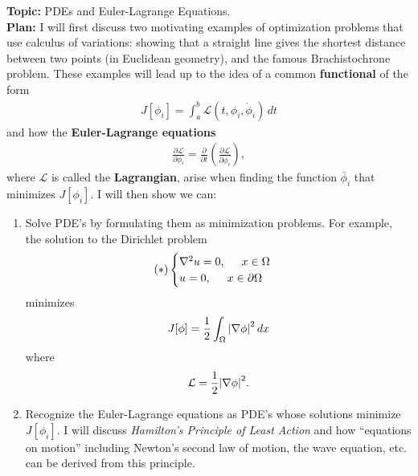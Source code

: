 \documentclass{article}
\theoremstyle{definition}
\newcommand{\p}{\partial}
\newcommand{\f}[2]{\frac{#1}{#2}}
\newcommand{\lp}{\left(}
\newcommand{\rp}{\right)}
\newcommand{\lag}{\mathcal{L}}
\begin{document}
\noindent \textbf{Topic:} PDEs and Euler-Lagrange Equations.\\

\noindent \textbf{Plan:} I will first discuss two motivating examples of optimization problems that use calculus of variations: showing that a straight line gives the shortest distance between two points (in Euclidean geometry), and the famous Brachistochrone problem. These examples will lead up to the idea of a common \textbf{functional} of the form
\begin{align*}
J[\phi_i] = \int^b_a \lag(t,\phi_i,\dot{\phi}_i)\,dt
\end{align*}
and how the \textbf{Euler-Lagrange equations}
\begin{align*}
\f{\p \lag }{\p \phi_i} = \f{\p}{\p t} \lp\f{\p \lag}{\p \dot{\phi}_i}\rp,
\end{align*}
where $\lag$ is called the \textbf{Lagrangian}, arise when finding the function $\bar{\phi}_i$ that minimizes $J[\phi_i]$. I will then show we can:
\begin{enumerate}
	\item Solve PDE's by formulating them as minimization problems. For example, the solution to the Dirichlet problem 
	\begin{align*}
	(\ast) \begin{cases}
	\nabla^2u = 0, \hspace{0.5cm}  \text{$x\in \Omega$}\\
	u = 0, \hspace{0.5cm} \text{$x \in \p \Omega$}
	\end{cases}
	\end{align*}
	minimizes 
	\begin{align*}
	J[\phi] = \f{1}{2}\int_\Omega \abs{\nabla \phi}^2\,dx
	\end{align*}
	where
	\begin{align*}
	\lag = \f{1}{2}\abs{\nabla \phi}^2.
	\end{align*}
	\item Recognize the Euler-Lagrange equations as PDE's whose solutions minimize $J[\phi_i]$. I will discuss \textit{Hamilton's Principle of Least Action} and how ``equations on motion'' including Newton's second law of motion, the wave equation, etc. can be derived from this principle. 
\end{enumerate}
\end{document}
